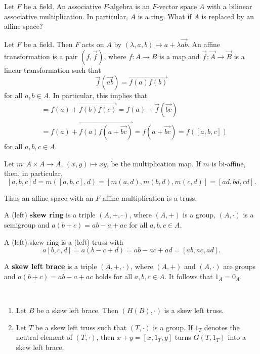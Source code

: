 \documentclass{svmult}
\begin{document}
Let $F$ be a field. An associative $F$-algebra is an $F$-vector space $A$ 
with a bilinear associative multiplication. In particular, $A$ is a ring. What if $A$ is replaced by 
an affine space?

\begin{example}
    Let $F$ be a field. Then 
    $F$ acts on $A$ by $(\lambda,a,b)\mapsto a+\lambda\overrightarrow{ab}$. An affine
    transformation is a pair $\left(f,\overrightarrow{f}\right)$, where 
    $f\colon A\to B$ is a map and $\overrightarrow{f}\colon \overrightarrow{A}\to\overrightarrow{B}$ is a linear
    transformation such that 
    \[
    \overrightarrow{f}\left(\overrightarrow{ab}\right)=\overrightarrow{f(a)f(b)}
    \]
    for all $a,b\in A$. In particular, this implies that 
    \begin{align*}
        [f(a),f(b),f(c)] &= f(a)+\overrightarrow{f(b)f(c)}
        =f(a)+\overrightarrow{f}\left(\overrightarrow{bc}\right)\\
        &=f(a)+\overrightarrow{f(a)f\left(a+\overrightarrow{bc}\right)}
        = f\left(a+\overrightarrow{bc}\right)
        = f\left([a,b,c]\right)
    \end{align*}
    for all $a,b,c\in A$. 
    
    Let $m\colon A\times A\to A$, $(x,y)\mapsto xy$, 
    be the multiplication map. 
    If $m$ is bi-affine, 
    then, in particular, 
    \[
    [a,b,c]d=m([a,b,c],d)=[m(a,d),m(b,d),m(c,d)]=[ad,bd,cd].
    \]
    
    Thus an affine space with an $F$-affine multiplication is a truss.
\end{example}

A (left) \textbf{skew ring} is a triple $(A,+,\cdot)$, where $(A,+)$ is a group, 
$(A,\cdot)$ is a semigroup and $a(b+c)=ab-a+ac$ for all $a,b,c\in A$. 

\begin{example}
    A (left) skew ring is a (left) truss
    with
    \[
    a[b,c,d]=a(b-c+d)=ab-ac+ad=[ab,ac,ad].
    \]
\end{example}

A \textbf{skew left brace} is a triple $(A,+,\cdot)$, where $(A,+)$ and $(A,\cdot)$ are
groups and $a(b+c)=ab-a+ac$ holds for all $a,b,c\in A$. It follows that
$1_A=0_A$.  

\begin{proposition}\
    \begin{enumerate}
        \item Let $B$ be a skew left brace. Then $\left(H(B),\cdot\right)$ is a skew left truss.
        \item Let $T$ be a skew left truss such that $(T,\cdot)$ is a group. If $1_T$ denotes
        the neutral element of $(T,\cdot)$, then 
            $x+y=[x,1_T,y]$ turns $G(T,1_T)$ into a skew left brace. 
    \end{enumerate}  
\end{proposition}
\end{document}
